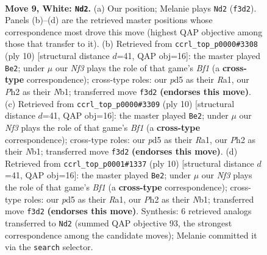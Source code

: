 \documentclass[11pt]{article}
\begin{document}
\clearpage

\begin{figure}[p]\centering
\begin{subfigure}{0.46\textwidth}\centering
\resizebox{\linewidth}{!}{%
\newchessgame
\chessboard[
  setfen={rnbqk1r1/pp2bppp/4p3/2Pp3n/3P4/2N2N2/PP3PPP/1RBQKB1R w Kq - 3 9},
  showmover=false,
  pgfstyle=straightmove, color=movearrow, markmove={f3-d2}
]}
\caption{}
\end{subfigure}\hfill
\begin{subfigure}{0.46\textwidth}\centering
\resizebox{\linewidth}{!}{%
\newchessgame
\chessboard[
  setfen={rnbqkbnr/1p3ppp/p7/2pp4/3P4/2P2N2/PP3PPP/RNBQKB1R w KQkq - 0 6},
  showmover=false,
  pgfstyle=straightmove, color=movearrow, markmove={f1-e2}
]}
\caption{}
\end{subfigure}
\\[4pt]
\begin{subfigure}{0.46\textwidth}\centering
\resizebox{\linewidth}{!}{%
\newchessgame
\chessboard[
  setfen={rnbqkbnr/1p3ppp/p7/2pp4/3P4/2P2N2/PP3PPP/RNBQKB1R w KQkq - 0 6},
  showmover=false,
  pgfstyle=straightmove, color=movearrow, markmove={f1-e2}
]}
\caption{}
\end{subfigure}\hfill
\begin{subfigure}{0.46\textwidth}\centering
\resizebox{\linewidth}{!}{%
\newchessgame
\chessboard[
  setfen={rnbqkbnr/1p3ppp/p7/2pp4/3P4/2P2N2/PP3PPP/RNBQKB1R w KQkq - 0 6},
  showmover=false,
  pgfstyle=straightmove, color=movearrow, markmove={f1-e2}
]}
\caption{}
\end{subfigure}
\caption{\textbf{Move 9, White: \texttt{Nd2}.} (a) Our position; Melanie plays \texttt{Nd2} (\texttt{f3d2}). Panels (b)--(d) are the retrieved master positions whose correspondence most drove this move (highest QAP objective among those that transfer to it). (b) Retrieved from \texttt{ccrl\_top\_p0000\#3308} (ply 10) [structural distance $d$=41, QAP obj=16]: the master played \texttt{Be2}; under $\mu$ our \emph{Nf3} plays the role of that game's \emph{Bf1} (a \textbf{cross-type} correspondence); cross-type roles: our \emph{p}d5 as their \emph{R}a1, our \emph{P}h2 as their \emph{N}b1; transferred move \texttt{f3d2} \textbf{(endorses this move)}. (c) Retrieved from \texttt{ccrl\_top\_p0000\#3309} (ply 10) [structural distance $d$=41, QAP obj=16]: the master played \texttt{Be2}; under $\mu$ our \emph{Nf3} plays the role of that game's \emph{Bf1} (a \textbf{cross-type} correspondence); cross-type roles: our \emph{p}d5 as their \emph{R}a1, our \emph{P}h2 as their \emph{N}b1; transferred move \texttt{f3d2} \textbf{(endorses this move)}. (d) Retrieved from \texttt{ccrl\_top\_p0001\#1337} (ply 10) [structural distance $d$=41, QAP obj=16]: the master played \texttt{Be2}; under $\mu$ our \emph{Nf3} plays the role of that game's \emph{Bf1} (a \textbf{cross-type} correspondence); cross-type roles: our \emph{p}d5 as their \emph{R}a1, our \emph{P}h2 as their \emph{N}b1; transferred move \texttt{f3d2} \textbf{(endorses this move)}. Synthesis: 6 retrieved analogs transferred to \texttt{Nd2} (summed QAP objective 93, the strongest correspondence among the candidate moves); Melanie committed it via the \texttt{search} selector.}
\label{fig:thought-m16}
\end{figure}
\end{document}
